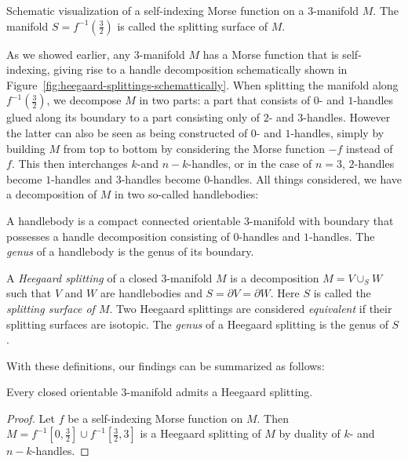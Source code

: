 \begin{marginfigure}
    \centering
    \caption{Schematic visualization of a self-indexing Morse function on a $3$-manifold $M$.
        The manifold $S = f^{-1}(\frac{3}{2})$ is called the splitting surface of $M$.
    }
    \label{fig:heegaard-splittings-schemattically}
\end{marginfigure}

As we showed earlier, any $3$-manifold $M$ has a Morse function that is self-indexing, giving rise to a handle decomposition schematically shown in Figure~\ref{fig:heegaard-splittings-schemattically}. When splitting the manifold along $f^{-1}(\frac{3}{2})$, we decompose $M$ in two parts: a part that consists of $0$- and $1$-handles glued along its boundary to a part consisting only of $2$- and  $3$-handles.
However the latter can also be seen as being constructed of $0$- and $1$-handles, simply by building $M$ from top to bottom by considering the Morse function $-f$ instead of $f$. This then interchanges $k$-and $n-k$-handles, or in the case of $n=3$, $2$-handles  become $1$-handles and $3$-handles become $0$-handles.
All things considered, we have a decomposition of $M$ in two so-called handlebodies:
\begin{definition}
    A handlebody is a compact connected orientable $3$-manifold with boundary that possesses a handle decomposition consisting of $0$-handles and $1$-handles. The \emph{genus} of a handlebody is the genus of its boundary.
\end{definition}
\begin{definition}
    A \emph{Heegaard splitting} of a closed $3$-manifold $M$ is a decomposition $M = V \cup _S W$ such that $V$ and $W$ are handlebodies and  $S = \partial V = \partial W$. Here  $S$ is called the \emph{splitting surface of $M$}.
    Two Heegaard splittings are considered \emph{equivalent} if their splitting surfaces are isotopic. The \emph{genus} of a Heegaard splitting is the genus of $S$.
\end{definition}

With these definitions, our findings can be summarized as follows:
\begin{theorem}
    Every closed orientable $3$-manifold admits a Heegaard splitting.
\end{theorem}
\begin{proof}
    Let $f$ be a self-indexing Morse function on $M$.
    Then $M = f^{-1}\left[0, \tfrac{3}{2}\right] \cup f^{-1}\left[\tfrac{3}{2}, 3\right]$ is a Heegaard splitting of $M$ by duality of $k$- and $n-k$-handles.
\end{proof}

